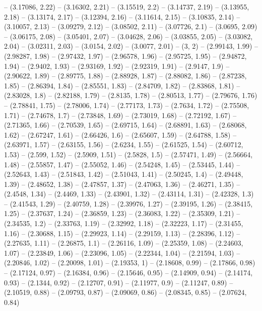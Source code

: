 -- (3.17086, 2.22)
-- (3.16302, 2.21)
-- (3.15519, 2.2)
-- (3.14737, 2.19)
-- (3.13955, 2.18)
-- (3.13174, 2.17)
-- (3.12394, 2.16)
-- (3.11614, 2.15)
-- (3.10835, 2.14)
-- (3.10057, 2.13)
-- (3.09279, 2.12)
-- (3.08502, 2.11)
-- (3.07726, 2.1)
-- (3.0695, 2.09)
-- (3.06175, 2.08)
-- (3.05401, 2.07)
-- (3.04628, 2.06)
-- (3.03855, 2.05)
-- (3.03082, 2.04)
-- (3.02311, 2.03)
-- (3.0154, 2.02)
-- (3.0077, 2.01)
-- (3, 2)
-- (2.99143, 1.99)
-- (2.98287, 1.98)
-- (2.97432, 1.97)
-- (2.96578, 1.96)
-- (2.95725, 1.95)
-- (2.94872, 1.94)
-- (2.9402, 1.93)
-- (2.93169, 1.92)
-- (2.92319, 1.91)
-- (2.9147, 1.9)
-- (2.90622, 1.89)
-- (2.89775, 1.88)
-- (2.88928, 1.87)
-- (2.88082, 1.86)
-- (2.87238, 1.85)
-- (2.86394, 1.84)
-- (2.85551, 1.83)
-- (2.84709, 1.82)
-- (2.83868, 1.81)
-- (2.83028, 1.8)
-- (2.82188, 1.79)
-- (2.8135, 1.78)
-- (2.80513, 1.77)
-- (2.79676, 1.76)
-- (2.78841, 1.75)
-- (2.78006, 1.74)
-- (2.77173, 1.73)
-- (2.7634, 1.72)
-- (2.75508, 1.71)
-- (2.74678, 1.7)
-- (2.73848, 1.69)
-- (2.73019, 1.68)
-- (2.72192, 1.67)
-- (2.71365, 1.66)
-- (2.70539, 1.65)
-- (2.69715, 1.64)
-- (2.68891, 1.63)
-- (2.68068, 1.62)
-- (2.67247, 1.61)
-- (2.66426, 1.6)
-- (2.65607, 1.59)
-- (2.64788, 1.58)
-- (2.63971, 1.57)
-- (2.63155, 1.56)
-- (2.6234, 1.55)
-- (2.61525, 1.54)
-- (2.60712, 1.53)
-- (2.599, 1.52)
-- (2.5909, 1.51)
-- (2.5828, 1.5)
-- (2.57471, 1.49)
-- (2.56664, 1.48)
-- (2.55857, 1.47)
-- (2.55052, 1.46)
-- (2.54248, 1.45)
-- (2.53445, 1.44)
-- (2.52643, 1.43)
-- (2.51843, 1.42)
-- (2.51043, 1.41)
-- (2.50245, 1.4)
-- (2.49448, 1.39)
-- (2.48652, 1.38)
-- (2.47857, 1.37)
-- (2.47063, 1.36)
-- (2.46271, 1.35)
-- (2.4548, 1.34)
-- (2.4469, 1.33)
-- (2.43901, 1.32)
-- (2.43114, 1.31)
-- (2.42328, 1.3)
-- (2.41543, 1.29)
-- (2.40759, 1.28)
-- (2.39976, 1.27)
-- (2.39195, 1.26)
-- (2.38415, 1.25)
-- (2.37637, 1.24)
-- (2.36859, 1.23)
-- (2.36083, 1.22)
-- (2.35309, 1.21)
-- (2.34535, 1.2)
-- (2.33763, 1.19)
-- (2.32992, 1.18)
-- (2.32223, 1.17)
-- (2.31455, 1.16)
-- (2.30688, 1.15)
-- (2.29923, 1.14)
-- (2.29159, 1.13)
-- (2.28396, 1.12)
-- (2.27635, 1.11)
-- (2.26875, 1.1)
-- (2.26116, 1.09)
-- (2.25359, 1.08)
-- (2.24603, 1.07)
-- (2.23849, 1.06)
-- (2.23096, 1.05)
-- (2.22344, 1.04)
-- (2.21594, 1.03)
-- (2.20846, 1.02)
-- (2.20098, 1.01)
-- (2.19353, 1)
-- (2.18608, 0.99)
-- (2.17866, 0.98)
-- (2.17124, 0.97)
-- (2.16384, 0.96)
-- (2.15646, 0.95)
-- (2.14909, 0.94)
-- (2.14174, 0.93)
-- (2.1344, 0.92)
-- (2.12707, 0.91)
-- (2.11977, 0.9)
-- (2.11247, 0.89)
-- (2.10519, 0.88)
-- (2.09793, 0.87)
-- (2.09069, 0.86)
-- (2.08345, 0.85)
-- (2.07624, 0.84)
